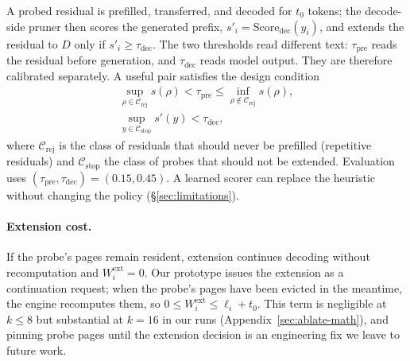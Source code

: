 A probed residual is prefilled, transferred, and decoded for $t_0$ tokens; the decode-side pruner then scores the generated prefix, $s'_i=\mathrm{Score}_{\mathrm{dec}}(y_i)$, and extends the residual to $D$ only if $s'_i\ge\tau_{\mathrm{dec}}$.
The two thresholds read different text: $\tau_{\mathrm{pre}}$ reads the residual before generation, and $\tau_{\mathrm{dec}}$ reads model output.
They are therefore calibrated separately.
A useful pair satisfies the design condition
\begin{gather}
\sup_{\rho\in\mathcal{C}_{\mathrm{rej}}}s(\rho)<\tau_{\mathrm{pre}}\le\inf_{\rho\notin\mathcal{C}_{\mathrm{rej}}}s(\rho), \label{eq:sep-pre}\\
\sup_{y\in\mathcal{C}_{\mathrm{stop}}}s'(y)<\tau_{\mathrm{dec}}, \nonumber
\end{gather}
where $\mathcal{C}_{\mathrm{rej}}$ is the class of residuals that should never be prefilled (repetitive residuals) and $\mathcal{C}_{\mathrm{stop}}$ the class of probes that should not be extended.
Evaluation uses $(\tau_{\mathrm{pre}},\tau_{\mathrm{dec}})=(0.15,0.45)$.
A learned scorer can replace the heuristic without changing the policy (\S\ref{sec:limitations}).

\paragraph{Extension cost.}
If the probe's pages remain resident, extension continues decoding without recomputation and $W_i^{\mathrm{ext}}{=}0$.
Our prototype issues the extension as a continuation request; when the probe's pages have been evicted in the meantime, the engine recomputes them, so $0\le W_i^{\mathrm{ext}}\le\ell_i+t_0$.
This term is negligible at $k\le 8$ but substantial at $k{=}16$ in our runs (Appendix~\ref{sec:ablate-math}), and pinning probe pages until the extension decision is an engineering fix we leave to future work.

